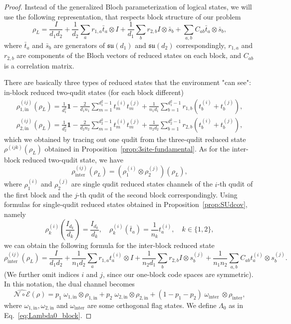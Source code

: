 \documentclass[10pt,twocolumn,superscriptaddress,aps,amsmath,amssymb,citeautoscript,floatfix,prx]{revtex4-2}
\theoremstyle{plain}
\theoremstyle{plain}
\theoremstyle{plain}
\theoremstyle{plain}
\theoremstyle{plain}
\theoremstyle{plain}
\theoremstyle{plain}
\theoremstyle{definition}
\theoremstyle{plain}
\begin{document}
\begin{appendix}
\begin{proof}
Instead of the generalized Bloch parameterization of logical states, we will use the following representation, that respects block structure of our problem
\[
    \rho_L=\frac{I}{d_1 d_2}+\frac{1}{d_2} \sum_a r_{1, a} \bar{t}_a \otimes I+\frac{1}{d_1} \sum_b r_{2, b} I \otimes \bar{s}_b+\sum_{a, b} C_{a b} \bar{t}_a \otimes \bar{s}_b,
\]
where $\bar{t}_a$ and $\bar{s}_b$ are generators of $\mathfrak{su}(d_1)$ and $\mathfrak{su}(d_2)$ correspondingly, $r_{1, a}$ and $r_{2, b}$ are components of the Bloch vectors of reduced states on each block, and $C_{a b}$ is a correlation matrix.

There are basically three types of reduced states that the environment "can see": in-block reduced two-qudit states (for each block different)
\[
\begin{gathered}
    \rho_{1,\text {in }}^{(ij)}(\rho_L)=\frac{1}{d_1^2} \mathbf{1}-\frac{2}{d_1 n_1} \sum_{m=1}^{d_1^2-1} t_m^{(i)} t_m^{(j)}+\frac{1}{n_1 d_1} \sum_{b=1}^{d_1^2-1} r_{1, b}\left(t_b^{(i)}+t_b^{(j)}\right),\\
    \rho_{2,\text {in }}^{(ij)}(\rho_L)=\frac{1}{d_2^2} \mathbf{1}-\frac{2}{d_2 n_2} \sum_{m=1}^{d_2^2-1} t_m^{(i)} t_m^{(j)}+\frac{1}{n_2 d_2} \sum_{b=1}^{d_2^2-1} r_{2, b}\left(t_b^{(i)}+t_b^{(j)}\right),
\end{gathered}
\]
which we obtained by tracing out one qudit from the three-qudit reduced state $\rho^{(ijk)}(\rho_L)$ obtained in Proposition~\ref{prop:3site-fundamental}. As for the inter-block reduced two-qudit state, we have
\[
    \rho_{\text {inter }}^{(ij)}\left(\rho_L\right)=\left(\rho_1^{(i)} \otimes \rho_2^{(j)}\right)\left(\rho_L\right),
\]
where $\rho_1^{(i)}$ and $\rho_2^{(j)}$ are single qudit reduced states channels of the $i$-th qudit of the first block and the $j$-th qudit of the second block correspondingly. Using formulas for single-qudit reduced states obtained in Proposition~\ref{prop:SUdcov}, namely 
\[
    \rho_k^{(i)}\left(\frac{I_{d_k}}{d_k}\right)=\frac{I_{d_k}}{d_k}, \quad \rho_k^{(i)}\left(\bar{t}_a\right)=\frac{1}{n_k} t_a^{(i)}, \quad k\in\{1,2\},
\]
we can obtain the following formula for the inter-block reduced state
\[
    \rho_{\text {inter }}^{(ij)}(\rho_L)=\frac{I}{d_1 d_2}+\frac{1}{n_1 d_2} \sum_a r_{1, a} t_a^{(i)} \otimes I+\frac{1}{n_2 d_1} \sum_b r_{2, b} I \otimes s_b^{(j)}+\frac{1}{n_1 n_2} \sum_{a, b} C_{a b} t_a^{(i)} \otimes s_b^{(j)}.
\]
(We further omit indices $i$ and $j$, since our one-block code spaces are symmetric). In this notation, the dual channel becomes
\[
    \widehat{\mathcal{N} \circ \mathcal{E}}(\rho)=p_1\;\omega_{1, \text{in}}\otimes \rho_{1,\text{in}} + p_2\;\omega_{2, \text {in}}\otimes \rho_{2,\text{in}} + (1-p_1-p_2)\;\omega_{\text {inter }} \otimes \rho_{\text{inter}},
\]
where $\omega_{1, \text{in}}, \omega_{2, \text{in}}$ and $\omega_{\text{inter}}$ are some orthogonal flag states. We define $\Lambda_0$ as in Eq.~\eqref{eq:Lambda0_block}.


\end{proof}
\end{appendix}
\end{document}
